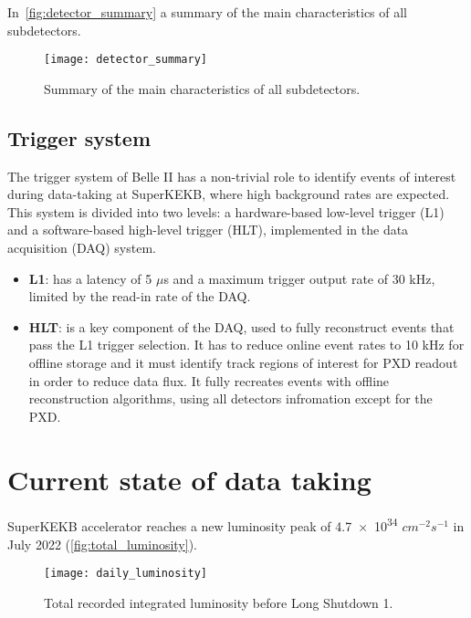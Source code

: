 In~\autoref{fig:detector_summary} a summary of the main characteristics of all subdetectors.


\begin{figure}[h!]
\centering
\texttt{[image: detector\_summary]}
\caption{Summary of the main characteristics of all subdetectors.}
\label{fig:detector_summary}
\end{figure}

\subsection{Trigger system}

The trigger system of Belle II has a non-trivial role to identify events of interest during data-taking at SuperKEKB, where high background rates are expected. 
This system is divided into two levels: a hardware-based low-level trigger (L1) and a software-based high-level trigger (HLT), implemented in the data acquisition (DAQ) system. 

\begin{itemize}
\item \textbf{L1}: has a latency of 5 $\mu$s and a maximum trigger output rate of 30 kHz, limited by the read-in rate of the DAQ.
\item \textbf{HLT}: is a key component of the DAQ, used to fully reconstruct events that pass the L1 trigger selection. It has to reduce online event rates to 10 kHz for offline storage and it must identify track regions of interest for PXD readout in order to reduce data flux. It fully recreates events with offline reconstruction algorithms, using all detectors infromation except for the PXD.
\end{itemize}



\section{Current state of data taking} \label{sec:perspectives}

SuperKEKB accelerator reaches a new luminosity peak of \num{4.7e34} $cm^{-2}s^{-1}$ in July 2022 (\autoref{fig:total_luminosity}).

\begin{figure}[h!]
\centering
\texttt{[image: daily\_luminosity]}
\caption{Total recorded integrated luminosity before Long Shutdown 1.}
\label{fig:total_luminosity}
\end{figure}

